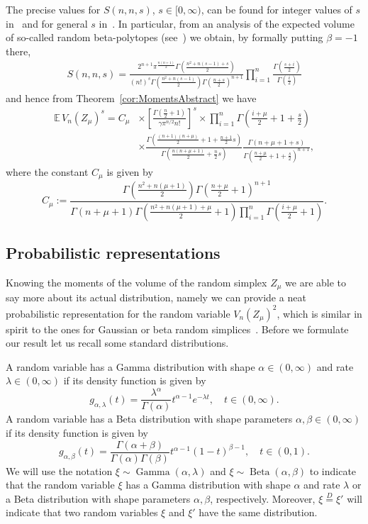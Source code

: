 \documentclass[10pt]{amsart}
\theoremstyle{definition}\newtheorem{defi}[theo]{Definition}\newtheorem{rema}[theo]{Remark}\newtheorem{exam}[theo]{Example}\newtheorem{exem}[theo]{Example}\newtheorem{nota}[theo]{Notation}
\newcommand{\EE}{\mathbb{E}\,}
\newcommand{\Gam}{\mathop{\mathrm{Gamma}}\nolimits}
\newcommand{\Bet}{\mathop{\mathrm{Beta}}\nolimits}
\begin{document}
The precise values for $S(n,n,s)$, $s\in[0,\infty)$, can be found for integer values of $s$ in~\cite{rM71} and for general $s$ in~\cite{KTT17}. In particular, from an analysis of the expected volume of so-called random beta-polytopes (see~\cite[Proposition~2.8]{KTT17}) we obtain, by formally putting $\beta=-1$ there,
\begin{align*}
S(n,n,s) = \frac{2^{n+1}\pi^{\frac{n(n+1)}{2}}\Gamma\left(\frac{n^2+n(s-1)+s}{2}\right)}{(n!)^s\Gamma\left(\frac{n^2+n(s-1)}{2}\right)\Gamma\left(\frac{n+s}{2}\right)^{n+1}}\prod\limits_{i=1}^{n}\frac{\Gamma\left(\frac{s+i}{2}\right)}{\Gamma\left(\frac{i}{2}\right)}
\end{align*}
and hence from Theorem~\ref{cor:MomentsAbstract} we have
\begin{equation}\label{eq:Moments}
\begin{aligned}
\EE V_n(Z_\mu)^s =C_{\mu}&\times\left[\frac{\Gamma\left(\frac{n}{2}+1\right)}{\gamma\pi^{n/2}n!}\right]^s\times\prod\limits_{i=1}^n\Gamma\left(\frac{i+\mu}{2}+1+\frac{s}{2}\right)\\
&\times\frac{\Gamma\left(\frac{(n+1)(n+\mu)}{2}+1+\frac{n+1}{2}s\right)}{\Gamma\left(\frac{n(n+\mu+1)}{2}+\frac{n}{2}s\right)}\frac{\Gamma(n+\mu+1+s)}{\Gamma\left(\frac{n+\mu}{2}+1+\frac{s}{2}\right)^{n+1}},
\end{aligned}
\end{equation}
where the constant $C_\mu$ is given by
\[
C_{\mu}:=\frac{\Gamma\left(\frac{n^2+n(\mu+1)}{2}\right)\Gamma\left(\frac{n+\mu}{2}+1\right)^{n+1}}{\Gamma(n+\mu+1)\Gamma\left(\frac{n^2+n(\mu+1)+\mu}{2}+1\right) \prod\limits_{i=1}^n\Gamma\left(\frac{i+\mu}{2}+1\right)}.
\]

\subsection{Probabilistic representations}

Knowing the moments of the volume of the random simplex $Z_{\mu}$ we are able to say more about its actual distribution, namely we can provide a neat probabilistic representation for the random variable $V_n(Z_{\mu})^2$, which is similar in spirit to the ones for Gaussian or beta random simplices~\cite{GKT17,rM71}. Before we formulate our result let us recall some standard distributions.

A random variable has a Gamma distribution with shape $\alpha\in(0,\infty)$ and rate $\lambda \in(0,\infty)$ if its density function is given by
\[
g_{\alpha,\lambda}(t)=\frac{\lambda^{\alpha}}{\Gamma(\alpha)}t^{\alpha-1}e^{-\lambda t},\quad t\in(0,\infty).
\]
A random variable has a Beta distribution with shape parameters $\alpha, \beta\in(0,\infty)$ if its density function is given by
\[
g_{\alpha,\beta}(t)=\frac{\Gamma(\alpha+\beta)}{\Gamma(\alpha)\Gamma(\beta)}t^{\alpha-1}(1-t)^{\beta - 1},\quad t\in(0,1).
\]
We will use the notation $\xi\sim \Gam(\alpha,\lambda)$ and $\xi\sim \Bet(\alpha,\beta)$ to indicate that the random variable $\xi$ has a Gamma distribution with shape $\alpha$ and rate $\lambda$ or a Beta distribution with shape parameters $\alpha, \beta$, respectively. Moreover, $\xi\overset{D}{=}\xi'$ will indicate that two random variables $\xi$ and $\xi'$ have the same distribution.
\end{document}
